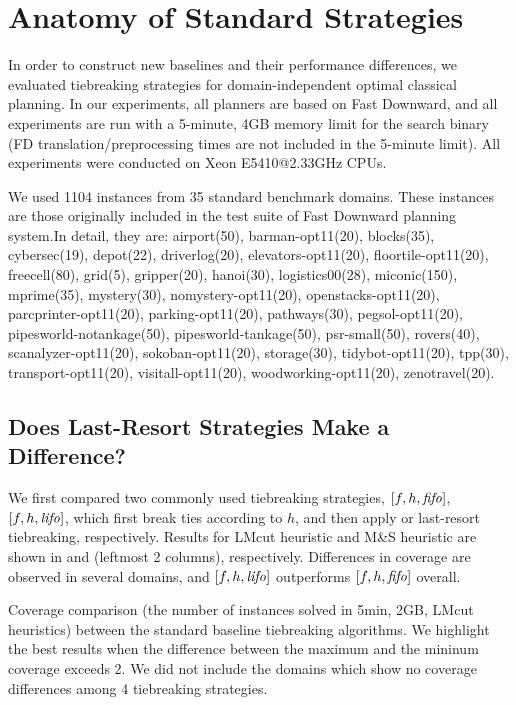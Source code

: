 \section{Anatomy of Standard Strategies}
\label{sec:eval-common-strategies}

In order to construct new baselines and their performance differences,
we evaluated tiebreaking strategies for domain-independent optimal
classical planning.  In our experiments, all planners are based on Fast
Downward, and all experiments are run with a 5-minute,
4GB memory limit for the search binary (FD translation/preprocessing
times are not included in the 5-minute limit).  All experiments were
conducted on Xeon E5410@2.33GHz CPUs. 

We used 1104 instances from 35 standard benchmark domains. These
instances are those originally included in the test suite of Fast
Downward planning system.In detail, they are: airport(50),
barman-opt11(20), blocks(35), cybersec(19), depot(22), driverlog(20),
elevators-opt11(20), floortile-opt11(20), freecell(80), grid(5),
gripper(20), hanoi(30), logistics00(28), miconic(150), mprime(35),
mystery(30), nomystery-opt11(20), openstacks-opt11(20),
parcprinter-opt11(20), parking-opt11(20), pathways(30),
pegsol-opt11(20), pipesworld-notankage(50), pipesworld-tankage(50),
psr-small(50), rovers(40), scanalyzer-opt11(20), sokoban-opt11(20),
storage(30), tidybot-opt11(20), tpp(30), transport-opt11(20),
visitall-opt11(20), woodworking-opt11(20), zenotravel(20).

\subsection{Does Last-Resort Strategies Make a Difference?}

We first compared two commonly used tiebreaking strategies, $[f,h,{\mbox{\textit{fifo}}}]$, $[f,h,{\mbox{\textit{lifo}}}]$, which
first break ties according to $h$, and then apply \fifo or \lifo
last-resort tiebreaking, respectively.
Results for LMcut heuristic \cite{Helmert2009} and M\&S heuristic \cite{HelmertHHN14} are
shown in  and 
(leftmost 2 columns), respectively.
Differences in coverage are observed in several domains, and
$[f,h,{\mbox{\textit{lifo}}}]$ outperforms $[f,h,{\mbox{\textit{fifo}}}]$ overall.

\begin{table}[htbp]
 {
 \centering
 
 \caption{
 Coverage comparison (the number of instances solved in 5min, 2GB, LMcut
 heuristics) between
 the standard baseline tiebreaking algorithms. We highlight the
 best results when the difference between the maximum and the mininum coverage exceeds 2.
 We did not include the domains which show no coverage differences among
 4 tiebreaking strategies.
 }
 \label{tbl:lmcut-ipc-full}
 }
\end{table}

